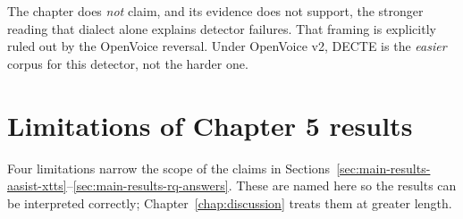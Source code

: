 The chapter does \emph{not} claim, and its evidence does not
support, the stronger reading that dialect alone explains detector
failures. That framing is explicitly ruled out by the OpenVoice
reversal. Under OpenVoice v2, DECTE is the \emph{easier} corpus for
this detector, not the harder one.


\section{Limitations of Chapter 5 results}
\label{sec:main-results-limitations}

Four limitations narrow the scope of the claims in Sections~\ref{sec:main-results-aasist-xtts}--\ref{sec:main-results-rq-answers}.
These are named here so the results can be interpreted correctly;
Chapter~\ref{chap:discussion} treats them at greater length.


